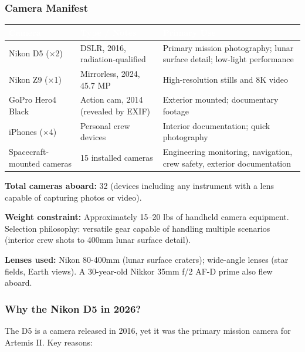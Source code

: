 \documentclass[11pt,letterpaper]{article}
\newcommand{\tableheader}[1]{\textbf{\sffamily\textcolor{white}{#1}}}
\begin{document}
\subsubsection{Camera Manifest}

\begin{center}
\begin{tabularx}{\textwidth}{L{3.5cm}L{3cm}X}
\toprule
{}
\tableheader{Camera} & \tableheader{Type / Notes} & \tableheader{Primary Use} \\
\midrule
Nikon D5 ($\times$2) & DSLR, 2016, radiation-qualified & Primary mission photography; lunar surface detail; low-light performance \\
Nikon Z9 ($\times$1) & Mirrorless, 2024, 45.7 MP & High-resolution stills and 8K video \\
GoPro Hero4 Black & Action cam, 2014 (revealed by EXIF) & Exterior mounted; documentary footage \\
iPhones ($\times$4) & Personal crew devices & Interior documentation; quick photography \\
Spacecraft-mounted cameras & 15 installed cameras & Engineering monitoring, navigation, crew safety, exterior documentation \\
\bottomrule
\end{tabularx}
\end{center}

\textbf{Total cameras aboard:} 32 (devices including any instrument with a lens capable of capturing photos or video).

\textbf{Weight constraint:} Approximately 15--20 lbs of handheld camera equipment. Selection philosophy: versatile gear capable of handling multiple scenarios (interior crew shots to 400mm lunar surface detail).

\textbf{Lenses used:} Nikon 80-400mm (lunar surface craters); wide-angle lenses (star fields, Earth views). A 30-year-old Nikkor 35mm f/2 AF-D prime also flew aboard.

\subsubsection{Why the Nikon D5 in 2026?}

The D5 is a camera released in 2016, yet it was the primary mission camera for Artemis II. Key reasons:
\end{document}
